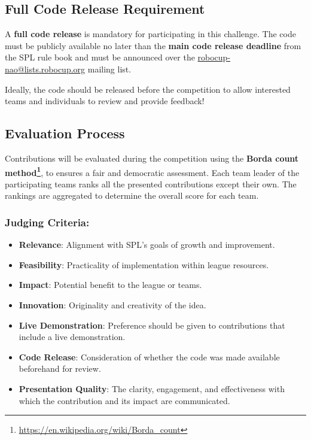 \subsection{Full Code Release Requirement}
A \textbf{full code release} is mandatory for participating in this challenge. The code must be publicly available no later than the \textbf{main code release deadline} from the SPL rule book and must be announced over the \url{robocup-nao@lists.robocup.org} mailing list.

Ideally, the code should be released before the competition to allow interested teams and individuals to review and provide feedback!

\subsection{Evaluation Process}
Contributions will be evaluated during the competition using the \textbf{Borda count method\footnote{\url{https://en.wikipedia.org/wiki/Borda_count}}}, to ensures a fair and democratic assessment. Each team leader of the participating teams ranks all the presented contributions except their own. The rankings are aggregated to determine the overall score for each team.

\subsubsection*{Judging Criteria:}
\begin{itemize}
    \item \textbf{Relevance}: Alignment with SPL’s goals of growth and improvement.
    \item \textbf{Feasibility}: Practicality of implementation within league resources.
    \item \textbf{Impact}: Potential benefit to the league or teams.
    \item \textbf{Innovation}: Originality and creativity of the idea.
    \item \textbf{Live Demonstration}: Preference should be given to contributions that include a live demonstration.
    \item \textbf{Code Release}: Consideration of whether the code was made available beforehand for review.
    \item \textbf{Presentation Quality}: The clarity, engagement, and effectiveness with which the contribution and its impact are communicated.
\end{itemize}

